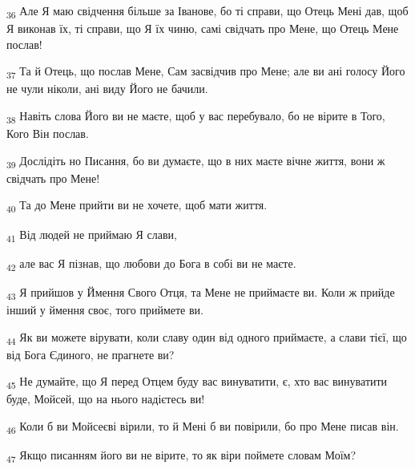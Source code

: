 \begin{tcolorbox}
\textsubscript{36} Але Я маю свідчення більше за Іванове, бо ті справи, що Отець Мені дав, щоб Я виконав їх, ті справи, що Я їх чиню, самі свідчать про Мене, що Отець Мене послав!
\end{tcolorbox}
\begin{tcolorbox}
\textsubscript{37} Та й Отець, що послав Мене, Сам засвідчив про Мене; але ви ані голосу Його не чули ніколи, ані виду Його не бачили.
\end{tcolorbox}
\begin{tcolorbox}
\textsubscript{38} Навіть слова Його ви не маєте, щоб у вас перебувало, бо не вірите в Того, Кого Він послав.
\end{tcolorbox}
\begin{tcolorbox}
\textsubscript{39} Дослідіть но Писання, бо ви думаєте, що в них маєте вічне життя, вони ж свідчать про Мене!
\end{tcolorbox}
\begin{tcolorbox}
\textsubscript{40} Та до Мене прийти ви не хочете, щоб мати життя.
\end{tcolorbox}
\begin{tcolorbox}
\textsubscript{41} Від людей не приймаю Я слави,
\end{tcolorbox}
\begin{tcolorbox}
\textsubscript{42} але вас Я пізнав, що любови до Бога в собі ви не маєте.
\end{tcolorbox}
\begin{tcolorbox}
\textsubscript{43} Я прийшов у Ймення Свого Отця, та Мене не приймаєте ви. Коли ж прийде інший у ймення своє, того приймете ви.
\end{tcolorbox}
\begin{tcolorbox}
\textsubscript{44} Як ви можете вірувати, коли славу один від одного приймаєте, а слави тієї, що від Бога Єдиного, не прагнете ви?
\end{tcolorbox}
\begin{tcolorbox}
\textsubscript{45} Не думайте, що Я перед Отцем буду вас винуватити, є, хто вас винуватити буде, Мойсей, що на нього надієтесь ви!
\end{tcolorbox}
\begin{tcolorbox}
\textsubscript{46} Коли б ви Мойсеєві вірили, то й Мені б ви повірили, бо про Мене писав він.
\end{tcolorbox}
\begin{tcolorbox}
\textsubscript{47} Якщо писанням його ви не вірите, то як віри поймете словам Моїм?
\end{tcolorbox}
